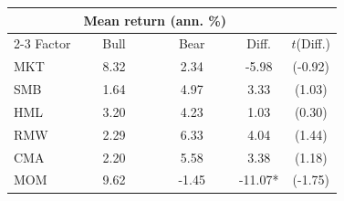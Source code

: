 \begin{tabular}{lcccc}
\toprule
 & \multicolumn{2}{c}{Mean return (ann. \%)} & & \\
\cmidrule(lr){2-3}
Factor & Bull & Bear & Diff. & $t$(Diff.) \\
\midrule
MKT & 8.32 & 2.34 & -5.98 & (-0.92) \\
SMB & 1.64 & 4.97 & 3.33 & (1.03) \\
HML & 3.20 & 4.23 & 1.03 & (0.30) \\
RMW & 2.29 & 6.33 & 4.04 & (1.44) \\
CMA & 2.20 & 5.58 & 3.38 & (1.18) \\
MOM & 9.62 & -1.45 & -11.07* & (-1.75) \\
\bottomrule
\end{tabular}
